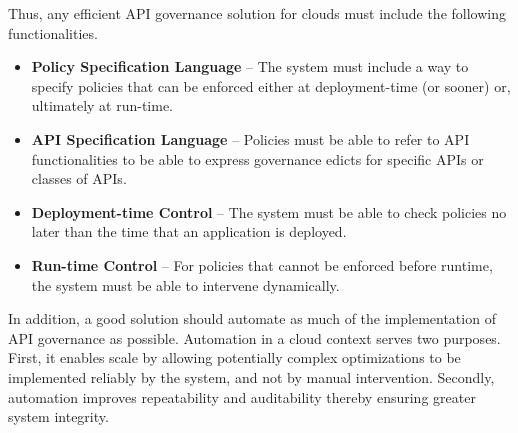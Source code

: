 Thus, any efficient API governance solution for clouds must include the
following functionalities.
\begin{itemize}
\item {\bf Policy Specification Language} -- The system must include a way to
specify policies that can be enforced either at deployment-time (or sooner)
or, ultimately at run-time.  
\item {\bf API Specification Language} -- Policies must be able to refer to
API functionalities to be able to express governance edicts for specific APIs
or classes of APIs.
\item {\bf Deployment-time Control} --  The system must be able to check policies
no later than the time that an application is deployed.
\item {\bf Run-time Control} -- For policies that cannot be enforced before
runtime, the system must be able to intervene dynamically.
\end{itemize}

In addition, a good solution should automate as much of the implementation
of API governance as possible.  Automation in a cloud context serves two
purposes.  First, it enables scale by allowing potentially complex
optimizations to be implemented reliably by the system, and not by manual
intervention.  Secondly, automation improves repeatability and auditability
thereby ensuring greater system integrity.